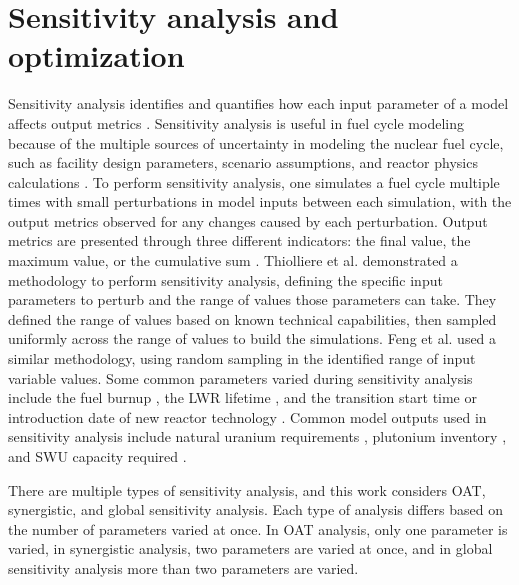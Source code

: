 %
%
%
\section{Sensitivity analysis and optimization}
Sensitivity analysis identifies and quantifies how each input parameter 
of a model affects output metrics \cite{thiolliere_methodology_2018}. 
Sensitivity analysis is useful in fuel cycle modeling because of the 
multiple sources of uncertainty in 
modeling the nuclear fuel cycle, such as facility design parameters, 
scenario assumptions, and reactor physics calculations 
\cite{noauthor_effects_2017}. To perform
sensitivity 
analysis, one simulates a fuel cycle multiple times 
with small perturbations in model inputs between each simulation, with 
the output metrics observed for any changes caused by each  
perturbation. Output metrics are presented through three different 
indicators: the final value, the maximum value, or the cumulative sum 
\cite{noauthor_effects_2017}. Thiolliere et al. 
\cite{thiolliere_methodology_2018} demonstrated a methodology to 
perform sensitivity analysis, defining the specific input parameters to 
perturb and the range of values those parameters can take.
They defined the range of values based on known technical capabilities, then 
sampled uniformly across the range of values to build the simulations. 
Feng et al. \cite{feng_sensitivity_2020} used a similar methodology, 
using random sampling in the identified range of input variable values.
Some common
parameters varied during sensitivity analysis include the fuel burnup 
\cite{thiolliere_methodology_2018,noauthor_effects_2017}, the \gls{LWR}
lifetime \cite{feng_sensitivity_2020,noauthor_effects_2017}, 
and the transition start time or introduction date of new reactor technology
\cite{chee_sensitivity_2019,passerini_systematic_2014,noauthor_effects_2017}. 
Common model outputs used in sensitivity analysis include 
natural uranium requirements 
\cite{richards_application_2021,noauthor_effects_2017},
plutonium inventory \cite{chee_sensitivity_2019,noauthor_effects_2017}, 
and \gls{SWU} 
capacity required \cite{richards_application_2021,noauthor_effects_2017}.

There are multiple types of sensitivity analysis, and this work considers 
\gls{OAT}, synergistic, and global sensitivity analysis. Each type of 
analysis differs based on the number of parameters varied at once. 
In \gls{OAT} analysis, only one parameter is varied, in synergistic 
analysis, two parameters are varied at once, and in global 
sensitivity analysis more than two parameters are varied. 

